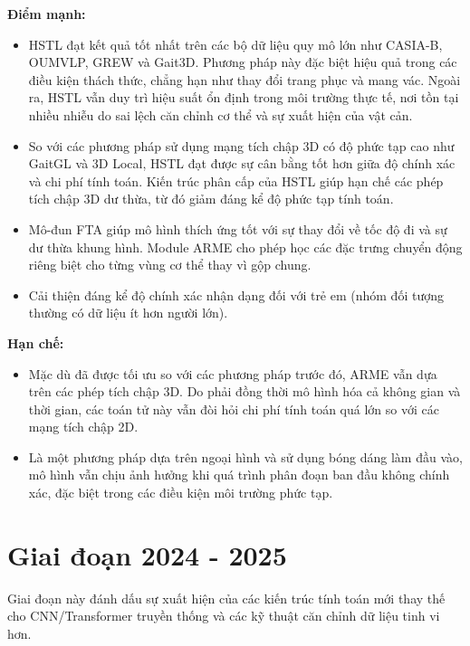 \textbf{Điểm mạnh:}
\begin{itemize}
  \item HSTL đạt kết quả tốt nhất trên các bộ dữ liệu quy mô lớn như CASIA-B, OUMVLP, GREW và Gait3D. Phương pháp này đặc biệt hiệu quả trong các điều kiện thách thức, chẳng hạn như thay đổi trang phục và mang vác. Ngoài ra, HSTL vẫn duy trì hiệu suất ổn định trong môi trường thực tế, nơi tồn tại nhiều nhiễu do sai lệch căn chỉnh cơ thể và sự xuất hiện của vật cản.
  \item So với các phương pháp sử dụng mạng tích chập 3D có độ phức tạp cao như GaitGL và 3D Local, HSTL đạt được sự cân bằng tốt hơn giữa độ chính xác và chi phí tính toán. Kiến trúc phân cấp của HSTL giúp hạn chế các phép tích chập 3D dư thừa, từ đó giảm đáng kể độ phức tạp tính toán.
  \item Mô-đun FTA giúp mô hình thích ứng tốt với sự thay đổi về tốc độ đi và sự dư thừa khung hình. Module ARME cho phép học các đặc trưng chuyển động riêng biệt cho từng vùng cơ thể thay vì gộp chung.
  \item Cải thiện đáng kể độ chính xác nhận dạng đối với trẻ em (nhóm đối tượng thường có dữ liệu ít hơn người lớn).

\end{itemize}

\textbf{Hạn chế:}
\begin{itemize}
  \item Mặc dù đã được tối ưu so với các phương pháp trước đó, ARME vẫn dựa trên các phép tích chập 3D. Do phải đồng thời mô hình hóa cả không gian và thời gian, các toán tử này vẫn đòi hỏi chi phí tính toán quá lớn so với các mạng tích chập 2D.
  \item Là một phương pháp dựa trên ngoại hình và sử dụng bóng dáng làm đầu vào, mô hình vẫn chịu ảnh hưởng khi quá trình phân đoạn ban đầu không chính xác, đặc biệt trong các điều kiện môi trường phức tạp.

\end{itemize}

\section{Giai đoạn 2024 - 2025}
Giai đoạn này đánh dấu sự xuất hiện của các kiến trúc tính toán mới thay thế cho CNN/Transformer truyền thống và các kỹ thuật căn chỉnh dữ liệu tinh vi hơn.

